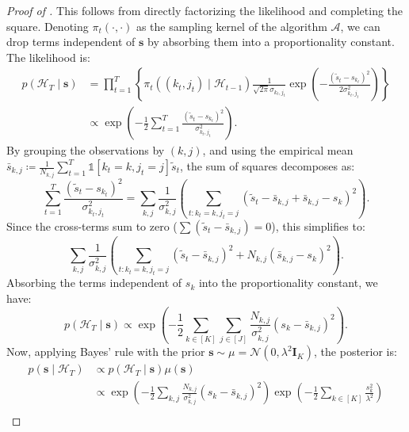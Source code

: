 \documentclass{article}
\def\vs{{\bm{s}}}
\def\mI{{\bm{I}}}
\def\gA{{\mathcal{A}}}
\def\gH{{\mathcal{H}}}
\def\gN{{\mathcal{N}}}
\theoremstyle{plain}
\theoremstyle{definition}
\theoremstyle{plain}
\newcommand{\indicator}{\mathds{1}}
\begin{document}
\begin{proof}[Proof of ]
    This follows from directly factorizing the likelihood and completing the square.
    Denoting $\pi_t(\cdot, \cdot)$ as the sampling kernel of the algorithm $\gA$, we can drop terms independent of $\vs$ by absorbing them into a proportionality constant. The likelihood is:
    \begin{align}
        p(\gH_T \mid \vs) &= \prod_{t=1}^T \left\{ \pi_t((k_t,j_t)\mid \gH_{t-1}) \frac{1}{\sqrt{2\pi}\sigma_{k_t,j_t}} \exp\left( - \frac{(\tilde{s}_t - s_{k_t})^2}{2\sigma_{k_t,j_t}^2} \right) \right\} \\
        &\propto \exp\left( - \frac{1}{2} \sum_{t=1}^T \frac{(\tilde{s}_t - s_{k_t})^2}{\sigma_{k_t,j_t}^2} \right).
    \end{align}
    By grouping the observations by $(k, j)$, and using the empirical mean $\bar{s}_{k,j} \coloneq \frac{1}{N_{k,j}} \sum_{t=1}^T \indicator[k_t = k, j_t = j] \tilde{s}_t$, the sum of squares decomposes as:
    \begin{equation}
        \sum_{t=1}^T \frac{(\tilde{s}_t - s_{k_t})^2}{\sigma_{k_t,j_t}^2} = \sum_{k,j} \frac{1}{\sigma_{k,j}^2} \left( \sum_{t: k_t=k, j_t=j} (\tilde{s}_t - \bar{s}_{k,j} + \bar{s}_{k,j} - s_{k})^2 \right).
    \end{equation}
    Since the cross-terms sum to zero ($\sum (\tilde{s}_t - \bar{s}_{k,j}) = 0$), this simplifies to:
    \begin{equation}
        \sum_{k,j} \frac{1}{\sigma_{k,j}^2} \left( \sum_{t: k_t=k, j_t=j} (\tilde{s}_t - \bar{s}_{k,j})^2 + N_{k,j}(\bar{s}_{k,j} - s_k)^2 \right).
    \end{equation}
    Absorbing the terms independent of $s_k$ into the proportionality constant, we have:
    \begin{equation}
        p(\gH_T \mid \vs) \propto \exp\left( - \frac{1}{2} \sum_{k \in [K]} \sum_{j \in [J]} \frac{N_{k,j}}{\sigma_{k,j}^2} (s_k - \bar{s}_{k,j})^2 \right).
    \end{equation}
    Now, applying Bayes' rule with the prior $\vs \sim \mu = \gN(0, \lambda^2 \mI_K)$, the posterior is:
    \begin{align}
        p(\vs \mid \gH_T) &\propto p(\gH_T \mid \vs) \mu(\vs) \\
        &\propto \exp\left( - \frac{1}{2} \sum_{k,j} \frac{N_{k,j}}{\sigma_{k,j}^2} (s_k - \bar{s}_{k,j})^2 \right) \exp\left( - \frac{1}{2} \sum_{k \in [K]} \frac{s_k^2}{\lambda^2} \right) \\

\end{align}
\end{proof}
\end{document}
